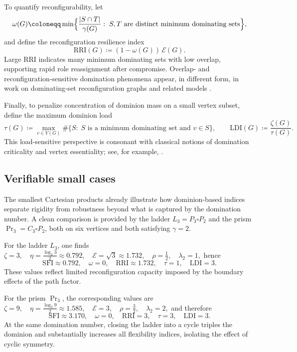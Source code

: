 \documentclass[11pt]{article}
\theoremstyle{plain}
\theoremstyle{definition}
\theoremstyle{remark}
\begin{document}
To quantify reconfigurability, let
\[
\omega(G)\coloneqq
\min\Bigl\{\frac{|S\cap T|}{\gamma(G)}:\; S,T \text{ are distinct minimum dominating sets}\Bigr\},
\]
and define the reconfiguration resilience index
\[
\mathrm{RRI}(G)\coloneqq (1-\omega(G))\,\mathcal{E}(G).
\]
Large $\mathrm{RRI}$ indicates many minimum dominating sets with low overlap, supporting rapid
role reassignment after compromise.  Overlap- and reconfiguration-sensitive domination phenomena
appear, in different form, in work on dominating-set reconfiguration graphs and related models
\cite{HaasSeyffarth2005,BonamyBousquet2016}.

Finally, to penalize concentration of dominion mass on a small vertex subset, define the maximum
dominion load
\[
\tau(G)\coloneqq
\max_{v\in V(G)}\#\{S:\; S \text{ is a minimum dominating set and } v\in S\},
\qquad
\mathrm{LDI}(G)\coloneqq \frac{\zeta(G)}{\tau(G)}.
\]
This load-sensitive perspective is consonant with classical notions of domination criticality
and vertex essentiality; see, for example, \cite{CockayneDawesHedetniemi1980,goddard-henning-2023}.

\subsection{Verifiable small cases}\label{subsec:small-cases}

The smallest Cartesian products already illustrate how dominion-based indices separate
rigidity from robustness beyond what is captured by the domination number.
A clean comparison is provided by the ladder $L_3=P_3\square P_2$ and the prism
$\Pr_3=C_3\square P_2$, both on six vertices and both satisfying $\gamma=2$.

For the ladder $L_3$, one finds
$
\zeta=3,\quad
\eta=\tfrac{\log_2 3}{2}\approx0.792,\quad
\mathcal{E}=\sqrt{3}\approx1.732,\quad
\rho=\tfrac12,\quad
\lambda_2=1,
$
hence
\[
\mathrm{SFI}\approx0.792,\quad
\omega=0,\quad
\mathrm{RRI}\approx1.732,\quad
\tau=1,\quad
\mathrm{LDI}=3.
\]
These values reflect limited reconfiguration capacity imposed by the boundary effects of
the path factor.

For the prism $\Pr_3$, the corresponding values are
$
\zeta=9,\quad
\eta=\tfrac{\log_2 9}{2}\approx1.585,\quad
\mathcal{E}=3,\quad
\rho=\tfrac32,\quad
\lambda_2=2,
$
and therefore
\[
\mathrm{SFI}\approx3.170,\quad
\omega=0,\quad
\mathrm{RRI}=3,\quad
\tau=3,\quad
\mathrm{LDI}=3.
\]
At the same domination number, closing the ladder into a cycle triples the dominion and
substantially increases all flexibility indices, isolating the effect of cyclic symmetry.
\end{document}
